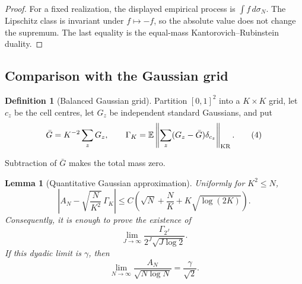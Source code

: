 \documentclass{aomart}
\newtheorem{lemma}[theorem]{Lemma}
\theoremstyle{definition}
\newtheorem{definition}[theorem]{Definition}
\newcommand{\1}{\mathbf 1}
\begin{document}
\begin{proof}
For a fixed realization, the displayed empirical process is
$\int f\,d\sigma_ N$. The Lipschitz class is invariant under $f\mapsto-f$,
so the absolute value does not change the supremum. The last equality is
the equal-mass Kantorovich--Rubinstein duality.

\end{proof}

\subsection{Comparison with the Gaussian grid}

\begin{definition}[Balanced Gaussian grid]\label{def:gaussian-grid}
Partition $[0,1]^2$ into a $K\times K$ grid, let $c_ z$ be the cell
centres, let $G_ z$ be independent standard Gaussians, and put
\begin{equation}
\bar G=K^{-2}\sum_ zG_ z,\qquad
\Gamma_ K=\mathbb E\left\|
\sum_ z(G_ z-\bar G)\delta_ {c_ z}\right\|_ {\rm KR}.
\tag{4}
\end{equation}

Subtraction of $\bar G$ makes the total mass zero.

\end{definition}

\begin{lemma}[Quantitative Gaussian approximation]\label{lem:gaussianization-dyadic}
Uniformly for $K^2\leq N$,
\begin{equation}
\left|A_ N-\sqrt{\frac N{K^2}}\,\Gamma_ K\right|
\leq C\left(\sqrt N+\frac NK+K\sqrt{\log(2K)}\right).
\tag{5}
\end{equation}
Consequently, it is enough to prove the existence of
\begin{equation}
\lim_ {J\to\infty}
\frac{\Gamma_ {2^J}}{2^J\sqrt{J\log2}}.
\tag{6}
\end{equation}
If this dyadic limit is $\gamma$, then
\begin{equation}
\lim_ {N\to\infty}\frac{A_ N}{\sqrt{N\log N}}
=\frac\gamma{\sqrt2}.
\tag{7}
\end{equation}

\end{lemma}
\end{document}
